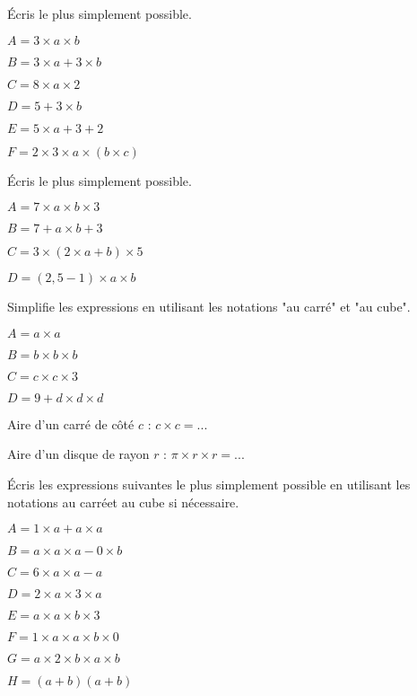 \begin{exercice}

Écris le plus simplement possible.
\begin{colenumerate}{2}
\item $A = 3 \times a \times b$
\item $B = 3 \times a  + 3 \times b$
\item $C = 8 \times a \times 2$
\item $D = 5 + 3 \times b$ 
\item $E = 5 \times a + 3 + 2$
\item $F = 2 \times 3 \times a \times (b \times c)$
\end{colenumerate}
\end{exercice}

\begin{exercice}[]Écris le plus simplement possible.
\begin{colenumerate}{2}
\item $A = 7 \times a \times b \times 3$
\item $B = 7 + a \times b + 3$
\item $C = 3 \times (2 \times a + b) \times 5$
\item $D = (2,5 - 1) \times a \times b$
\end{colenumerate}
\end{exercice}

\begin{exercice}[]Simplifie les expressions en utilisant les notations "au carré" et "au cube".
\begin{colenumerate}{2}
\item $A = a \times a$
\item $B = b \times b \times b$
\item $C = c \times c \times 3$
\item $D = 9 + d  \times d \times d$
\item Aire d'un carré de côté $c$ : $c \times c = ...$
\item Aire d'un disque de rayon $r$ : $\pi \times r \times r = ...$
\end{colenumerate}
\end{exercice}

\begin{exercice}
Écris les expressions suivantes le plus simplement possible en utilisant les notations \og au carré\fg et \og au cube \fg si nécessaire.
\begin{colenumerate}{2}
\item $A = 1 \times a + a \times a$
\item $B = a \times a \times a - 0 \times b$
\item $C = 6 \times a \times a - a$
\item $D = 2 \times a \times 3 \times a$
\item $E = a \times a \times b \times 3$
\item $F = 1 \times a \times a \times b \times 0$
\item $G = a \times 2 \times b \times a \times b$
\item $H = (a + b)(a + b)$
\end{colenumerate}
\end{exercice}

